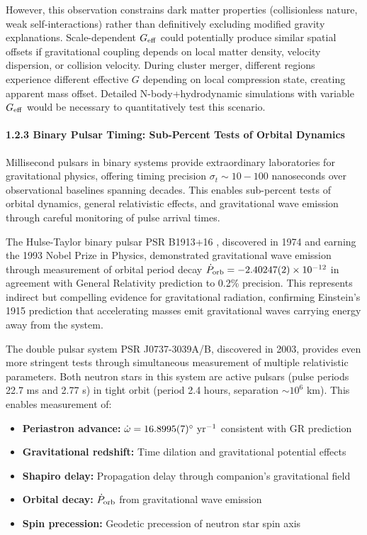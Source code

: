 \documentclass[11pt,a4paper]{article}
\providecommand{\tightlist}{\setlength{\itemsep}{0pt}\setlength{\parskip}{0pt}}
\begin{document}
However, this observation constrains dark matter properties
(collisionless nature, weak self-interactions) rather than definitively
excluding modified gravity explanations. Scale-dependent \(G_{\rm eff}\)
could potentially produce similar spatial offsets if gravitational
coupling depends on local matter density, velocity dispersion, or
collision velocity. During cluster merger, different regions experience
different effective \(G\) depending on local compression state, creating
apparent mass offset. Detailed N-body+hydrodynamic simulations with
variable \(G_{\rm eff}\) would be necessary to quantitatively test this
scenario.

\hypertarget{binary-pulsar-timing-sub-percent-tests-of-orbital-dynamics}{%
\paragraph{1.2.3 Binary Pulsar Timing: Sub-Percent Tests of Orbital
Dynamics}\label{binary-pulsar-timing-sub-percent-tests-of-orbital-dynamics}}

Millisecond pulsars in binary systems provide extraordinary laboratories
for gravitational physics, offering timing precision
\(\sigma_t \sim 10-100\) nanoseconds over observational baselines
spanning decades. This enables sub-percent tests of orbital dynamics,
general relativistic effects, and gravitational wave emission through
careful monitoring of pulse arrival times.

The Hulse-Taylor binary \cite{Hulse1975} pulsar PSR B1913+16 \cite{Taylor1979}, discovered in 1974 and
earning the 1993 Nobel Prize in Physics, demonstrated gravitational wave
emission through measurement of orbital period decay
\(\dot{P}_{\rm orb} = -2.40247(2) \times 10^{-12}\) in agreement with
General Relativity prediction to 0.2\% precision. This represents
indirect but compelling evidence for gravitational radiation, confirming
Einstein's 1915 prediction that accelerating masses emit gravitational
waves carrying energy away from the system.

The double pulsar system PSR J0737-3039A/B, discovered in 2003, provides
even more stringent tests through simultaneous measurement of multiple
relativistic parameters. Both neutron stars in this system are active
pulsars (pulse periods 22.7 ms and 2.77 s) in tight orbit (period 2.4
hours, separation \(\sim 10^6\) km). This enables measurement of:

\begin{itemize}
\tightlist
\item
  \textbf{Periastron advance:}
  \(\dot{\omega} = 16.8995(7)^\circ~{\rm yr^{-1}}\) consistent with GR
  prediction
\item
  \textbf{Gravitational redshift:} Time dilation and gravitational
  potential effects
\item
  \textbf{Shapiro delay:} Propagation delay through companion's
  gravitational field
\item
  \textbf{Orbital decay:} \(\dot{P}_{\rm orb}\) from gravitational wave
  emission
\item
  \textbf{Spin precession:} Geodetic precession of neutron star spin
  axis
\end{itemize}
\end{document}
